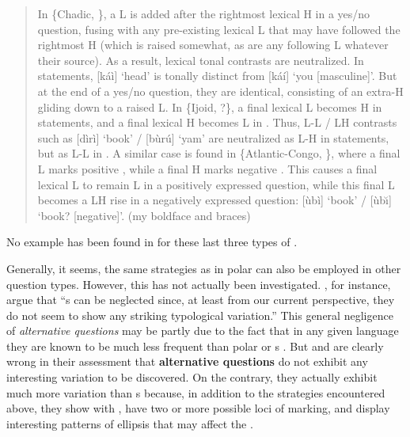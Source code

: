 \begin{quote}
In \textbf{} \{Chadic, \}, a L is added after the rightmost lexical H in a yes/no question, fusing with any pre-existing lexical L that may have followed the rightmost H (which is raised somewhat, as are any following L  whatever their source). As a result, lexical tonal contrasts are neutralized. In statements, [káì] ‘head’ is tonally distinct from [káí] ‘you [masculine]’. But at the end of a yes/no question, they are identical, consisting of an extra-H gliding down to a raised L. In \textbf{} \{Ijoid, ?\}, a final lexical L becomes H in statements, and a final lexical H becomes L in . Thus, L-L / LH contrasts such as [dìrì] ‘book’ / [bùrú] ‘yam’ are neutralized as L-H in statements, but as L-L in . A similar case is found in \textbf{} \{Atlantic-Congo, \}, where a final L marks positive , while a final H marks negative . This causes a final lexical L to remain L in a positively expressed question, while this final L becomes a LH rise in a negatively expressed question: [ùbì] ‘book’ / [ùb\u{\i}] ‘book? [negative]’. (my boldface and braces)
\end{quote}

\noindent No example has been found in  for these last three types of .

Generally, it seems, the same  strategies as in polar  can also be employed in other question types. However, this has not actually been investigated. \cite[292]{KönigSiemund2007}, for instance, argue that “s can be neglected since, at least from our current perspective, they do not seem to show any striking typological variation.” This general negligence of \textit{alternative questions} may be partly due to the fact that in any given language they are known to be much less frequent than polar or s \citep[2728]{Hoymann2010}. But \cite{Siemund2001} and \cite{KönigSiemund2007} are clearly wrong in their assessment that \textbf{alternative questions} do not exhibit any interesting variation to be discovered. On the contrary, they actually exhibit much more variation than s because, in addition to the  strategies encountered above, they show  with , have two or more possible loci of marking, and display interesting patterns of ellipsis that may affect the .

